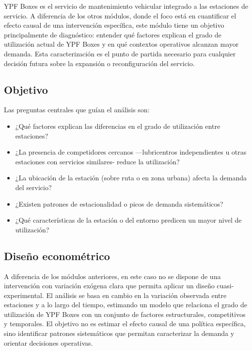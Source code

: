 
YPF Boxes es el servicio de mantenimiento vehicular integrado a las estaciones de 
servicio. A diferencia de los otros módulos, donde el foco está en cuantificar el 
efecto causal de una intervención específica, este módulo tiene un objetivo 
principalmente de diagnóstico: entender qué factores explican el grado de utilización 
actual de YPF Boxes y en qué contextos operativos alcanzan mayor demanda. Esta 
caracterización es el punto de partida necesario para cualquier decisión futura sobre 
la expansión o reconfiguración del servicio.

\subsection{Objetivo}

Las preguntas centrales que guían el análisis son:

\begin{itemize}
    \item ¿Qué factores explican las diferencias en el grado de utilización entre 
    estaciones?
    \item ¿La presencia de competidores cercanos —lubricentros independientes u 
    otras estaciones con servicios similares- reduce la utilización?
    \item ¿La ubicación de la estación (sobre ruta o en zona urbana) afecta la 
    demanda del servicio?
    \item ¿Existen patrones de estacionalidad o picos de demanda sistemáticos?
    \item ¿Qué características de la estación o del entorno predicen un mayor 
    nivel de utilización?
\end{itemize}

\subsection{Diseño econométrico}

A diferencia de los módulos anteriores, en este caso no se dispone de una 
intervención con variación exógena clara que permita aplicar un diseño 
cuasi-experimental. El análisis se basa en cambio en la variación observada entre 
estaciones y a lo largo del tiempo, estimando un modelo que relaciona el grado de 
utilización de YPF Boxes con un conjunto de factores estructurales, competitivos y 
temporales. El objetivo no es estimar el efecto causal de una política específica, 
sino identificar patrones sistemáticos que permitan caracterizar la demanda y orientar 
decisiones operativas.



